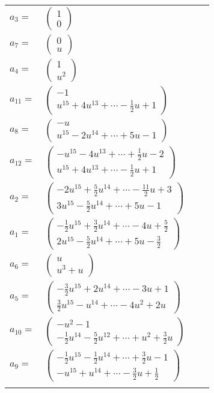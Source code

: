 \documentclass[1p]{elsarticle_modified}
\theoremstyle{definition}
\begin{document}
\begin{tabular}{m{7pt} m{180pt} m{7pt} m{180pt} }
\flushright $a_{3}=$&$\begin{pmatrix}1\\0\end{pmatrix}$ \\
\flushright $a_{7}=$&$\begin{pmatrix}0\\u\end{pmatrix}$ \\
\flushright $a_{4}=$&$\begin{pmatrix}1\\u^2\end{pmatrix}$ \\
\flushright $a_{11}=$&$\begin{pmatrix}-1\\u^{15}+4 u^{13}+\cdots-\frac{1}{2} u+1\end{pmatrix}$ \\
\flushright $a_{8}=$&$\begin{pmatrix}- u\\u^{15}-2 u^{14}+\cdots+5 u-1\end{pmatrix}$ \\
\flushright $a_{12}=$&$\begin{pmatrix}- u^{15}-4 u^{13}+\cdots+\frac{1}{2} u-2\\u^{15}+4 u^{13}+\cdots-\frac{1}{2} u+1\end{pmatrix}$ \\
\flushright $a_{2}=$&$\begin{pmatrix}-2 u^{15}+\frac{5}{2} u^{14}+\cdots-\frac{11}{2} u+3\\3 u^{15}-\frac{5}{2} u^{14}+\cdots+5 u-1\end{pmatrix}$ \\
\flushright $a_{1}=$&$\begin{pmatrix}-\frac{1}{2} u^{15}+\frac{3}{2} u^{14}+\cdots-4 u+\frac{5}{2}\\2 u^{15}-\frac{5}{2} u^{14}+\cdots+5 u-\frac{3}{2}\end{pmatrix}$ \\
\flushright $a_{6}=$&$\begin{pmatrix}u\\u^3+u\end{pmatrix}$ \\
\flushright $a_{5}=$&$\begin{pmatrix}-\frac{3}{2} u^{15}+2 u^{14}+\cdots-3 u+1\\\frac{3}{2} u^{15}- u^{14}+\cdots-4 u^2+2 u\end{pmatrix}$ \\
\flushright $a_{10}=$&$\begin{pmatrix}- u^2-1\\-\frac{1}{2} u^{14}-\frac{5}{2} u^{12}+\cdots+u^2+\frac{3}{2} u\end{pmatrix}$ \\
\flushright $a_{9}=$&$\begin{pmatrix}-\frac{1}{2} u^{15}-\frac{1}{2} u^{14}+\cdots+\frac{3}{2} u-1\\- u^{15}+u^{14}+\cdots-\frac{3}{2} u+\frac{1}{2}\end{pmatrix}$\\&\end{tabular}
\end{document}
